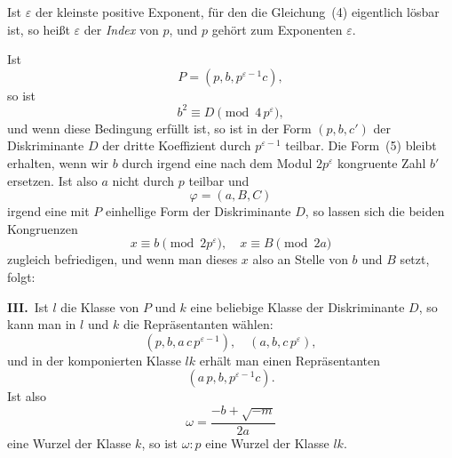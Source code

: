 \documentclass[12pt,a4paper]{article}
\theoremstyle{weber}
\begin{document}
Ist $\varepsilon$ der kleinste positive Exponent, für den die Gleichung~(4) eigentlich lösbar ist, so heißt $\varepsilon$ der \textit{Index} von $p$, und $p$ gehört zum Exponenten $\varepsilon$.

Ist
\begin{equation}
P = (p, b, p^{\varepsilon-1} c),
\end{equation}
so ist
\[
b^2 \equiv D \pmod{4\,p^\varepsilon},
\]
und wenn diese Bedingung erfüllt ist, so ist in der Form $(p, b, c')$ der Diskriminante $D$ der dritte Koeffizient durch $p^{\varepsilon-1}$ teilbar. Die Form~(5) bleibt erhalten, wenn wir $b$ durch irgend eine nach dem Modul $2p^\varepsilon$ kongruente Zahl $b'$ ersetzen. Ist also $a$ nicht durch $p$ teilbar und
\[
\varphi = (a, B, C)
\]
irgend eine mit $P$ einhellige Form der Diskriminante $D$, so lassen sich die beiden Kongruenzen
\[
x \equiv b \pmod{2p^\varepsilon}, \quad x \equiv B \pmod{2a}
\]
zugleich befriedigen, und wenn man dieses $x$ also an Stelle von $b$ und $B$ setzt, folgt:

\medskip
\textbf{III.}\ Ist $l$ die Klasse von $P$ und $k$ eine beliebige Klasse der Diskriminante $D$, so kann man in $l$ und $k$ die Repräsentanten wählen:
\begin{equation}
(p, b, a\,c\,p^{\varepsilon-1}), \quad (a, b, c\,p^\varepsilon),
\end{equation}
und in der komponierten Klasse $lk$ erhält man einen Repräsentanten
\begin{equation}
(a\,p, b, p^{\varepsilon-1} c).
\end{equation}
Ist also
\[
\omega = \frac{-b + \sqrt{-m}}{2a}
\]
eine Wurzel der Klasse $k$, so ist $\omega : p$ eine Wurzel der Klasse $lk$.
\end{document}
